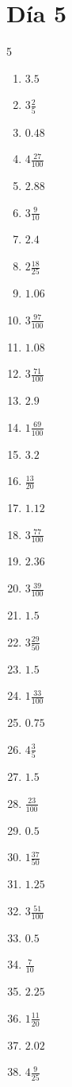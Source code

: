 \documentclass[12pt]{article}
\begin{document}
\section*{Día 5}
\begin{multicols}{5}\begin{enumerate}
		\item $ 3.5 $
		\item $ 3 \frac{2}{5} $
		\item $ 0.48 $
		\item $ 4 \frac{27}{100} $
		\item $ 2.88 $
		\item $ 3 \frac{9}{10} $
		\item $ 2.4 $
		\item $ 2 \frac{18}{25} $
		\item $ 1.06 $
		\item $ 3 \frac{97}{100} $
		\item $ 1.08 $
		\item $ 3 \frac{71}{100} $
		\item $ 2.9 $
		\item $ 1 \frac{69}{100} $
		\item $ 3.2 $
		\item $ \frac{13}{20} $
		\item $ 1.12 $
		\item $ 3 \frac{77}{100} $
		\item $ 2.36 $
		\item $ 3 \frac{39}{100} $
		\item $ 1.5 $
		\item $ 3 \frac{29}{50} $
		\item $ 1.5 $
		\item $ 1 \frac{33}{100} $
		\item $ 0.75 $
		\item $ 4 \frac{3}{5} $
		\item $ 1.5 $
		\item $ \frac{23}{100} $
		\item $ 0.5 $
		\item $ 1 \frac{37}{50} $
		\item $ 1.25 $
		\item $ 3 \frac{51}{100} $
		\item $ 0.5 $
		\item $ \frac{7}{10} $
		\item $ 2.25 $
		\item $ 1 \frac{11}{20} $
		\item $ 2.02 $
		\item $ 4 \frac{9}{25} $

\end{enumerate}
\end{multicols}
\end{document}
